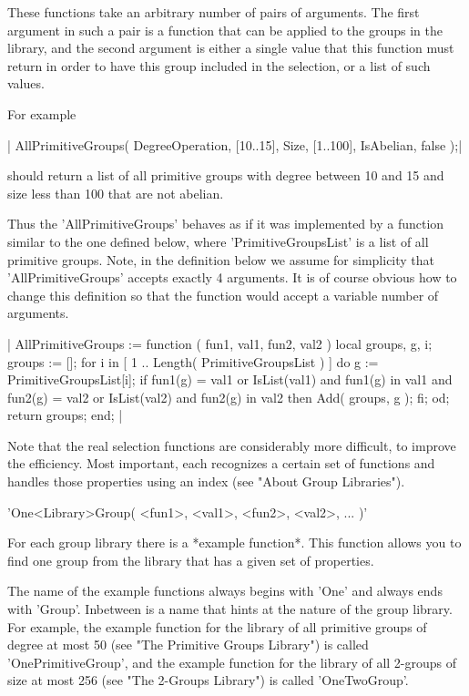 These  functions take an  arbitrary number of  pairs of  arguments.   The
first argument in such a pair  is a function  that can  be applied to the
groups in the library,  and the second  argument is either a single value
that this  function must return in  order  to have this group included in
the selection, or a list of such values.

For example

|    AllPrimitiveGroups( DegreeOperation,  [10..15],
                        Size,             [1..100],
                        IsAbelian,        false    );|

should return a list of all primitive  groups with  degree between 10 and
15 and size less than 100 that are not abelian.

Thus  the 'AllPrimitiveGroups'  behaves  as if   it was implemented  by a
function similar to the one defined below, where 'PrimitiveGroupsList' is
a list of all primitive groups.  Note, in  the definition below we assume
for simplicity that 'AllPrimitiveGroups' accepts exactly 4 arguments.  It
is of course  obvious how to change this  definition so that the function
would accept a variable number of arguments.

|    AllPrimitiveGroups := function ( fun1, val1, fun2, val2 )
        local    groups, g, i;
        groups := [];
        for i  in [ 1 .. Length( PrimitiveGroupsList ) ] do
            g := PrimitiveGroupsList[i];
            if      fun1(g) = val1  or IsList(val1) and fun1(g) in val1
                and fun2(g) = val2  or IsList(val2) and fun2(g) in val2
            then
                Add( groups, g );
            fi;
        od;
        return groups;
    end; |

Note that the real  selection functions are considerably more  difficult,
to improve the efficiency.  Most important, each recognizes a certain set
of  functions and handles those  properties using  an index  (see  "About
Group Libraries").


'One<Library>Group( <fun1>, <val1>, <fun2>, <val2>, ... )'

For  each  group library there  is  a  *example function*.  This function
allows you to find one group  from  the  library that has a given  set of
properties.

The name of the example  functions always  begins  with  'One' and always
ends with 'Group'.  Inbetween is a name that hints  at the nature of  the
group  library. For example, the example function for the  library of all
primitive  groups  of  degree  at  most  50 (see  "The  Primitive  Groups
Library") is called 'OnePrimitiveGroup', and the example function for the
library of  all 2-groups of size at most 256 (see "The 2-Groups Library")
is called 'OneTwoGroup'.

